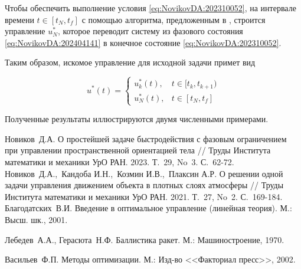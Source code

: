 Чтобы обеспечить выполнение условия \eqref{eq:NovikovDA:202310052}, на интервале времени $t\in[t_N,t_f]$ с помощью алгоритма, предложенным в \cite{1}, строится  управление $u^*_N$, которое переводит систему из фазового состояния \eqref{eq:NovikovDA:202404141} в конечное  состояние \eqref{eq:NovikovDA:202310052}.

Таким образом, искомое управление для исходной задачи примет вид

\begin{equation}
u^*(t)=	
\begin{cases}
u^*_k(t),& t\in[t_k,t_{k+1}) \\
u^*_N(t),& t\in[t_N,t_f] 
\end{cases}	
\end{equation}

Полученные результаты иллюстрируются двумя численными примерами.

\begin{thebibliography}{99}
Новиков~Д.А. {О простейшей задаче быстродействия с фазовым ограничением при управлении пространственной ориентацией тела} // Труды Института математики и механики УрО РАН. 2023. Т.~29, No~3. С.~62-72.
Новиков~Д.А.,~Кандоба И.Н.,~Козмин И.В.,~Плаксин А.Р. { О решении одной задачи управления движением объекта в плотных слоях атмосферы} // Труды Института математики и механики УрО РАН. 2021. Т.~27, No~2. С.~169-184.
 Благодатских~В.И. { Введение в оптимальное управление (линейная теория)}. М.: Высш. шк., 2001.

 Лебедев~А.А., Герасюта~Н.Ф. { Баллистика ракет}. М.: Машиностроение, 1970.

 Васильев~Ф.П. { Методы оптимизации}. М.: Изд-во <<Факториал пресс>>, 2002.

\end{thebibliography}






%

